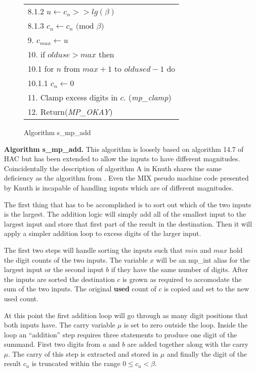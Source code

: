 \documentclass[b5paper]{book}
\begin{document}
\begin{figure}[!here]
\begin{center}
\begin{small}
\begin{tabular}{l}
\hspace{+6mm}8.1.2  $u \leftarrow c_n >> lg(\beta)$ \\
\hspace{+6mm}8.1.3  $c_n \leftarrow c_n \mbox{ (mod }\beta\mbox{)}$ \\
9.  $c_{max} \leftarrow u$ \\
10.  if $olduse > max$ then \\
\hspace{+3mm}10.1  for $n$ from $max + 1$ to $oldused - 1$ do \\
\hspace{+6mm}10.1.1  $c_n \leftarrow 0$ \\
11.  Clamp excess digits in $c$.  (\textit{mp\_clamp}) \\
12.  Return(\textit{MP\_OKAY}) \\
\hline
\end{tabular}
\end{small}
\end{center}
\caption{Algorithm s\_mp\_add}
\end{figure}

\textbf{Algorithm s\_mp\_add.}
This algorithm is loosely based on algorithm 14.7 of HAC \cite[pp. 594]{HAC} but has been extended to allow the inputs to have different magnitudes.  
Coincidentally the description of algorithm A in Knuth \cite[pp. 266]{TAOCPV2} shares the same deficiency as the algorithm from \cite{HAC}.  Even the 
MIX pseudo  machine code presented by Knuth \cite[pp. 266-267]{TAOCPV2} is incapable of handling inputs which are of different magnitudes.

The first thing that has to be accomplished is to sort out which of the two inputs is the largest.  The addition logic
will simply add all of the smallest input to the largest input and store that first part of the result in the
destination.  Then it will apply a simpler addition loop to excess digits of the larger input.

The first two steps will handle sorting the inputs such that $min$ and $max$ hold the digit counts of the two 
inputs.  The variable $x$ will be an mp\_int alias for the largest input or the second input $b$ if they have the
same number of digits.  After the inputs are sorted the destination $c$ is grown as required to accomodate the sum 
of the two inputs.  The original \textbf{used} count of $c$ is copied and set to the new used count.  

At this point the first addition loop will go through as many digit positions that both inputs have.  The carry
variable $\mu$ is set to zero outside the loop.  Inside the loop an ``addition'' step requires three statements to produce
one digit of the summand.  First
two digits from $a$ and $b$ are added together along with the carry $\mu$.  The carry of this step is extracted and stored
in $\mu$ and finally the digit of the result $c_n$ is truncated within the range $0 \le c_n < \beta$.
\end{document}
